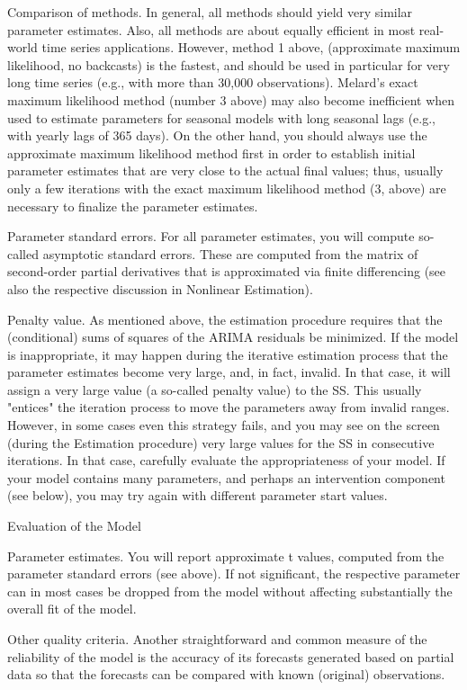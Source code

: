 Comparison of methods. In general, all methods should yield very similar parameter estimates. Also, all methods are about equally efficient in most real-world time series applications. However, method 1 above, (approximate maximum likelihood, no backcasts) is the fastest, and should be used in particular for very long time series (e.g., with more than 30,000 observations). Melard's exact maximum likelihood method (number 3 above) may also become inefficient when used to estimate parameters for seasonal models with long seasonal lags (e.g., with yearly lags of 365 days). On the other hand, you should always use the approximate maximum likelihood method first in order to establish initial parameter estimates that are very close to the actual final values; thus, usually only a few iterations with the exact maximum likelihood method (3, above) are necessary to finalize the parameter estimates.

Parameter standard errors. For all parameter estimates, you will compute so-called asymptotic standard errors. These are computed from the matrix of second-order partial derivatives that is approximated via finite differencing (see also the respective discussion in Nonlinear Estimation).

Penalty value. As mentioned above, the estimation procedure requires that the (conditional) sums of squares of the ARIMA residuals be minimized. If the model is inappropriate, it may happen during the iterative estimation process that the parameter estimates become very large, and, in fact, invalid. In that case, it will assign a very large value (a so-called penalty value) to the SS. This usually "entices" the iteration process to move the parameters away from invalid ranges. However, in some cases even this strategy fails, and you may see on the screen (during the Estimation procedure) very large values for the SS in consecutive iterations. In that case, carefully evaluate the appropriateness of your model. If your model contains many parameters, and perhaps an intervention component (see below), you may try again with different parameter start values.

Evaluation of the Model

Parameter estimates. You will report approximate t values, computed from the parameter standard errors (see above). If not significant, the respective parameter can in most cases be dropped from the model without affecting substantially the overall fit of the model.

Other quality criteria. Another straightforward and common measure of the reliability of the model is the accuracy of its forecasts generated based on partial data so that the forecasts can be compared with known (original) observations.



